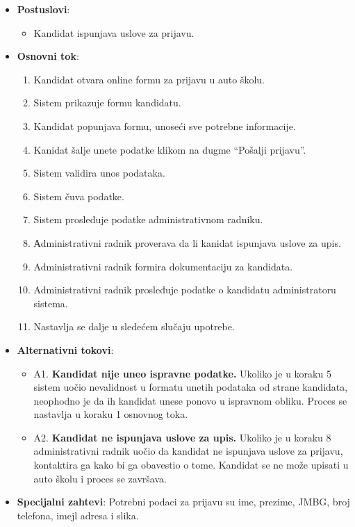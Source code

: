 \begin{itemize}
\begin{itemize}
    \end{itemize}
  \item \textbf{Postuslovi}:
      \begin{itemize}
      \item Kandidat ispunjava uslove za prijavu.
      \end{itemize}
  \item \textbf{Osnovni tok}:
      \begin{enumerate}
        \item Kandidat otvara online formu za prijavu u auto školu.
        \item Sistem prikazuje formu kandidatu.
        \item Kandidat popunjava formu, unoseći sve potrebne informacije.
        \item Kanidat šalje unete podatke klikom na dugme “Pošalji prijavu”.
        \item Sistem validira unos podataka.
        \item Sistem čuva podatke.
        \item Sistem prosleđuje podatke administrativnom radniku.
        \item Аdministrativni radnik proverava da li kanidat ispunjava uslove za upis.
        \item Administrativni radnik formira dokumentaciju za kandidata.
        \item Administrativni radnik prosleđuje podatke o kandidatu administratoru sistema.
        \item Nastavlja se dalje u sledećem slučaju upotrebe.
      \end{enumerate}

  \item \textbf{Alternativni tokovi}:
      \begin{itemize}
        \item A1. \textbf{Kandidat nije uneo ispravne podatke.}
        Ukoliko je u koraku 5 sistem uočio nevalidnost u formatu unetih podataka od strane kandidata, neophodno je da ih kandidat unese ponovo u ispravnom obliku.
        Proces se nastavlja u koraku 1 osnovnog toka.
        \item A2. \textbf{Kandidat ne ispunjava uslove za upis.}
        Ukoliko je u koraku 8 administrativni radnik uočio da kandidat ne ispunjava uslove za prijavu, kontaktira ga kako bi ga obavestio o tome.
        Kandidat se ne može upisati u auto školu i proces se završava.
      \end{itemize}

  \item \textbf{Specijalni zahtevi}:\newline
  Potrebni podaci za prijavu su ime, prezime, JMBG, broj telefona, imejl adresa i slika.
\end{itemize}

